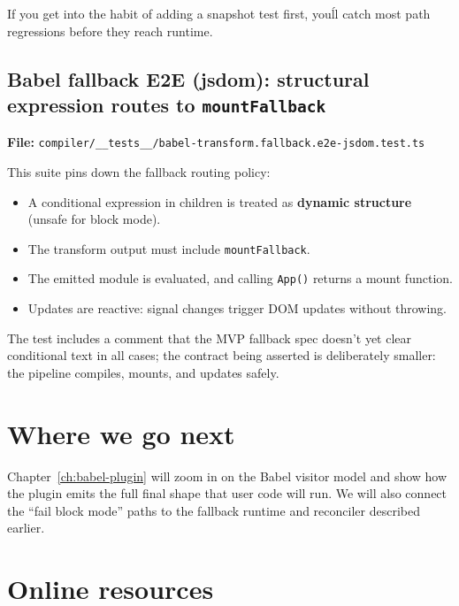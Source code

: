 If you get into the habit of adding a snapshot test first, you\'ll catch most path regressions before they reach runtime.

\subsection{Babel fallback E2E (jsdom): structural expression routes to \texttt{mountFallback}}


	\textbf{File:} \texttt{compiler/\_\_tests\_\_/babel-transform.fallback.e2e-jsdom.test.ts}

This suite pins down the fallback routing policy:

\begin{itemize}
\item A conditional expression in children is treated as \textbf{dynamic structure} (unsafe for block mode).
\item The transform output must include \texttt{mountFallback}.
\item The emitted module is evaluated, and calling \texttt{App()} returns a mount function.
\item Updates are reactive: signal changes trigger DOM updates without throwing.
\end{itemize}

The test includes a comment that the MVP fallback spec doesn't yet clear conditional text in all cases; the contract being asserted is deliberately smaller: the pipeline compiles, mounts, and updates safely.

\section{Where we go next}

Chapter~\ref{ch:babel-plugin} will zoom in on the Babel visitor model and show how the plugin emits the full final shape that user code will run.
We will also connect the ``fail block mode'' paths to the fallback runtime and reconciler described earlier.

\section{Online resources}

